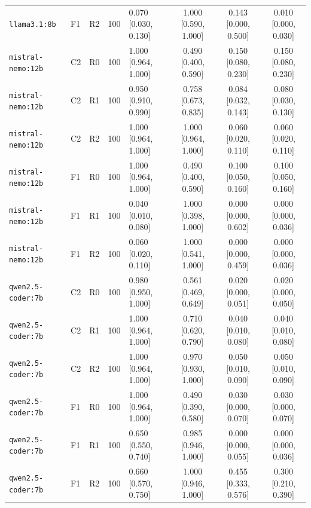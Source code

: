 \begin{table}[t]
\begin{tabular}{@{}lllrlccc@{}}
    \texttt{llama3.1:8b} & F1 & R2 & 100 & 0.070 [0.030, 0.130] & 1.000 [0.590, 1.000] & 0.143 [0.000, 0.500] & 0.010 [0.000, 0.030] \\
    \texttt{mistral-nemo:12b} & C2 & R0 & 100 & 1.000 [0.964, 1.000] & 0.490 [0.400, 0.590] & 0.150 [0.080, 0.230] & 0.150 [0.080, 0.230] \\
    \texttt{mistral-nemo:12b} & C2 & R1 & 100 & 0.950 [0.910, 0.990] & 0.758 [0.673, 0.835] & 0.084 [0.032, 0.143] & 0.080 [0.030, 0.130] \\
    \texttt{mistral-nemo:12b} & C2 & R2 & 100 & 1.000 [0.964, 1.000] & 1.000 [0.964, 1.000] & 0.060 [0.020, 0.110] & 0.060 [0.020, 0.110] \\
    \texttt{mistral-nemo:12b} & F1 & R0 & 100 & 1.000 [0.964, 1.000] & 0.490 [0.400, 0.590] & 0.100 [0.050, 0.160] & 0.100 [0.050, 0.160] \\
    \texttt{mistral-nemo:12b} & F1 & R1 & 100 & 0.040 [0.010, 0.080] & 1.000 [0.398, 1.000] & 0.000 [0.000, 0.602] & 0.000 [0.000, 0.036] \\
    \texttt{mistral-nemo:12b} & F1 & R2 & 100 & 0.060 [0.020, 0.110] & 1.000 [0.541, 1.000] & 0.000 [0.000, 0.459] & 0.000 [0.000, 0.036] \\
    \texttt{qwen2.5-coder:7b} & C2 & R0 & 100 & 0.980 [0.950, 1.000] & 0.561 [0.469, 0.649] & 0.020 [0.000, 0.051] & 0.020 [0.000, 0.050] \\
    \texttt{qwen2.5-coder:7b} & C2 & R1 & 100 & 1.000 [0.964, 1.000] & 0.710 [0.620, 0.790] & 0.040 [0.010, 0.080] & 0.040 [0.010, 0.080] \\
    \texttt{qwen2.5-coder:7b} & C2 & R2 & 100 & 1.000 [0.964, 1.000] & 0.970 [0.930, 1.000] & 0.050 [0.010, 0.090] & 0.050 [0.010, 0.090] \\
    \texttt{qwen2.5-coder:7b} & F1 & R0 & 100 & 1.000 [0.964, 1.000] & 0.490 [0.390, 0.580] & 0.030 [0.000, 0.070] & 0.030 [0.000, 0.070] \\
    \texttt{qwen2.5-coder:7b} & F1 & R1 & 100 & 0.650 [0.550, 0.740] & 0.985 [0.946, 1.000] & 0.000 [0.000, 0.055] & 0.000 [0.000, 0.036] \\
    \texttt{qwen2.5-coder:7b} & F1 & R2 & 100 & 0.660 [0.570, 0.750] & 1.000 [0.946, 1.000] & 0.455 [0.333, 0.576] & 0.300 [0.210, 0.390] \\
    \bottomrule
  \end{tabular}
\end{table}
